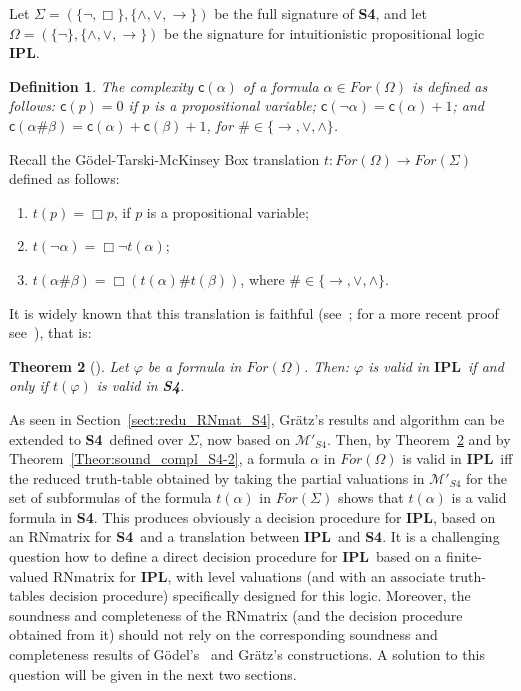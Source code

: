 \documentclass[12pt]{article}
\newtheorem{theorem}{Theorem}[section]
\newtheorem{definition}[theorem]{Definition}
\newcommand {\co} {\textsf{c}}
\newcommand{\ipl}{\ensuremath{\mathbf{IPL}}}
\newcommand{\sfo}{\textbf{S4}}
\begin{document}
Let $\Sigma= (\{\neg,\Box\},\{\land,\vee,\to\})$ be the full signature of \sfo, and let $\Omega = (\{ \neg \}, \{ \land, \lor, \rightarrow \} )$ be the signature for intuitionistic propositional logic \ipl. 

\begin{definition} \label{complex-fbf-IPL}
The {\em complexity} $\co(\alpha)$ of a formula $\alpha \in For(\Omega)$ is defined as follows:  $\co(p)=0$ if $p$ is  a propositional variable; $\co(\neg \alpha)= \co(\alpha)+1$; and $\co(\alpha \# \beta)=\co(\alpha)+\co(\beta)+1$, for $\# \in \{\to,\vee,\land\}$.
\end{definition}


Recall the G\"odel-Tarski-McKinsey Box translation $t:For(\Omega) \rightarrow For(\Sigma)$ defined as follows:

    \begin{enumerate}[label=\roman*)]
        \item $t(p) = \Box p$, if $p$ is a propositional variable;
        \item $t(\neg \alpha) = \Box \neg t(\alpha)$;
        \item $t(\alpha \# \beta) = \Box (t(\alpha) \# t(\beta))$, where $\# \in \{ \rightarrow, \lor, \land \}$.
     \end{enumerate}   



It is widely known that this translation is faithful (see~\cite{McKinsey:Tarsk:48}; for a more recent proof see~\cite{mints2012godel}), that is:

\begin{theorem}[\cite{McKinsey:Tarsk:48}] \label{teor-McKinsey:Tarski} Let $\varphi$ be a formula in $For(\Omega)$. Then: $\varphi$ is valid in \ipl\ if and only if $t(\varphi)$ is valid in \sfo.
\end{theorem}

As seen in Section~\ref{sect:redu_RNmat_S4}, Gr\"atz's results and algorithm can be extended to \sfo\ defined over $\Sigma$, now  based on  $\mathcal{M}'_{S4}$.
Then, by Theorem~\ref{teor-McKinsey:Tarski} and by Theorem~\ref{Theor:sound_compl_S4-2}, a formula $\alpha$ in $For(\Omega)$  is valid in \ipl\ iff the reduced truth-table  obtained by taking the partial valuations in $\mathcal{M}'_{S4}$ for the set of subformulas of the formula $t(\alpha)$ in $For(\Sigma)$ shows that $t(\alpha)$ is a valid formula in \sfo. This produces obviously a decision procedure for \ipl, based on an RNmatrix for \sfo\ and a translation between \ipl\ and \sfo. It is a challenging question how to define a direct decision procedure for \ipl\ based on a finite-valued RNmatrix for \ipl, with level valuations (and with an associate truth-tables decision procedure) specifically designed for this logic. Moreover, the soundness and completeness of the RNmatrix (and the decision procedure obtained from it) should not rely on the corresponding soundness and completeness results of G\"odel's~\cite{Godel1933} and  Gr\"atz's constructions. A solution to this question will be given in the next two sections.
\end{document}
